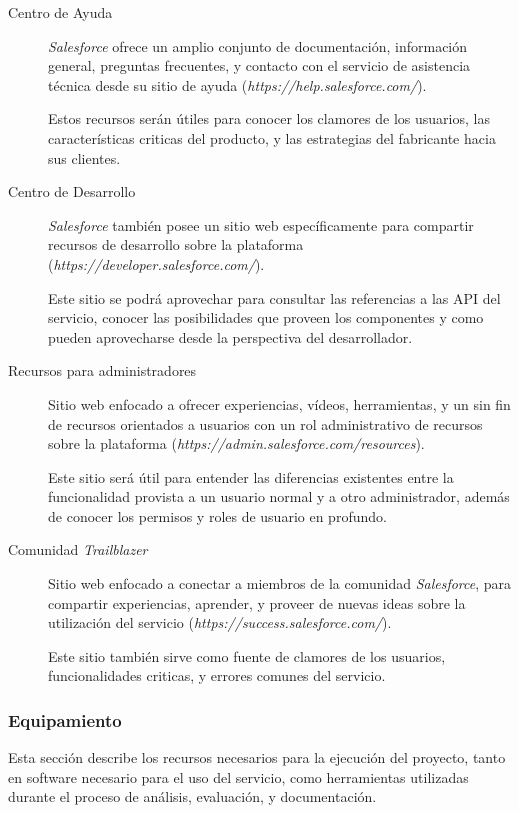 \begin{description}
\item [Centro de Ayuda] \emph{Salesforce} ofrece un amplio conjunto de
documentación, información general, preguntas frecuentes, y contacto con el
servicio de asistencia técnica desde su sitio de ayuda
(\emph{https://help.salesforce.com/}).

Estos recursos serán útiles para conocer los clamores de los usuarios, las
características criticas del producto, y las estrategias del fabricante hacia
sus clientes.

\item [Centro de Desarrollo] \emph{Salesforce} también posee un sitio web
específicamente para compartir recursos de desarrollo sobre la plataforma
(\emph{https://developer.salesforce.com/}).

Este sitio se podrá aprovechar para consultar las referencias a las API del
servicio, conocer las posibilidades que proveen los componentes y como pueden
aprovecharse desde la perspectiva del desarrollador.

\item [Recursos para administradores] Sitio web enfocado a ofrecer experiencias,
vídeos, herramientas, y un sin fin de recursos orientados a usuarios con un rol
administrativo de recursos sobre la plataforma
(\emph{https://admin.salesforce.com/resources}).

Este sitio será útil para entender las diferencias existentes entre la
funcionalidad provista a un usuario normal y a otro administrador, además de
conocer los permisos y roles de usuario en profundo.

\item [Comunidad \emph{Trailblazer}] Sitio web enfocado a conectar a miembros de
la comunidad \emph{Salesforce}, para compartir experiencias, aprender, y proveer
de nuevas ideas sobre la utilización del servicio
(\emph{https://success.salesforce.com/}).

Este sitio también sirve como fuente de clamores de los usuarios, funcionalidades
criticas, y errores comunes del servicio.

\end{description}

\subsubsection{Equipamiento}
Esta sección describe los recursos necesarios para la ejecución del
proyecto, tanto en software necesario para el uso del servicio,  como
herramientas utilizadas durante el proceso de análisis, evaluación, y
documentación.

